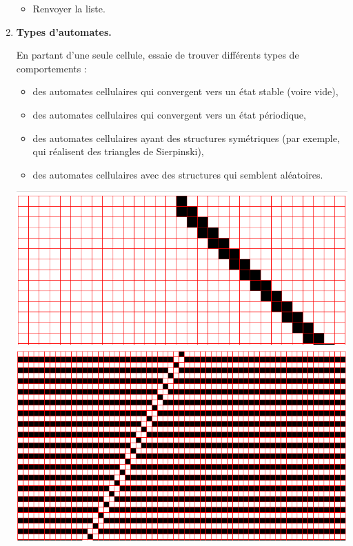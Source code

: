 \documentclass[11pt,class=report,crop=false]{standalone}
\begin{document}
\begin{activite}
\begin{enumerate}
\begin{algorithme}
\begin{itemize}
   \item Renvoyer la liste.
   
 \end{itemize}  
 \end{algorithme}

	
	
	
  \item \textbf{Types d'automates.}
  
  En partant d'une seule cellule, essaie de trouver différents types de comportements :
  \begin{itemize}
    \item des automates cellulaires qui convergent vers un état stable (voire vide),
    \item des automates cellulaires qui convergent vers un état périodique,
    \item des automates cellulaires ayant des structures symétriques (par exemple, qui réalisent des triangles de Sierpinski),
    \item des automates cellulaires avec des structures qui semblent aléatoires.
  \end{itemize}
  	


\begin{center}
\includegraphics[scale=\myscale,scale=0.2]{ecran-automate-3}
\includegraphics[scale=\myscale,scale=0.2]{ecran-automate-2}
\end{center}	


\end{enumerate}
\end{activite}
\end{document}
